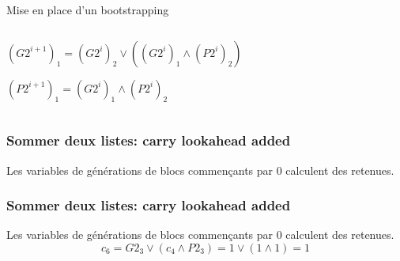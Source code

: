 \documentclass[10pt,xcolor={usenames,dvipsnames}]{beamer}
\begin{document}
\begin{section}{Mise en place d'un bootstrapping}
\begin{frame}
\begin{columns}
\begin{column}{0.6\textwidth}
${(G2^{i+1})}_1 = {(G2^i)}_2 \vee \left ( {(G2^i)}_1 \wedge {(P2^i)}_2 \right)$\\

\vspace{0.3cm}

${(P2^{i+1})}_1 = {(G2^i)}_1 \wedge {(P2^i)}_2$

\end{column}
\end{columns}

\end{frame} 


\begin{frame} 
\frametitle{Sommer deux listes: carry lookahead added}
  \begin{figure}
    \begin{center}
      \begin{tikzpicture}[scale = 0.7, transform shape]
      	
      \end{tikzpicture}
    \end{center}
  \end{figure}
Les variables de générations de blocs commençants par 0 calculent des retenues.
\[\quad \]
\[\quad \]
\end{frame} 


\begin{frame} 
\frametitle{Sommer deux listes: carry lookahead added}
  \begin{figure}
    \begin{center}
      \begin{tikzpicture}[scale = 0.7, transform shape]
      	
      \end{tikzpicture}
    \end{center}
  \end{figure}
Les variables de générations de blocs commençants par 0 calculent des retenues.
\[c_6 = G2_3 \vee \left( c_4 \wedge P2_3\right) = 1 \vee \left( 1 \wedge 1 \right) = 1 \]
\[\quad\]
\end{frame} 



\end{section}
\end{document}
